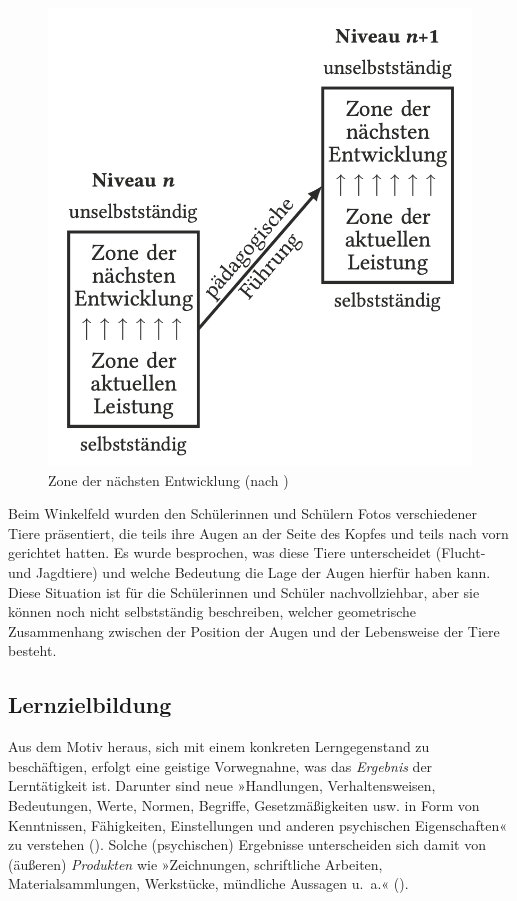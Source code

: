 \documentclass[
]{scrbook}
\renewenvironment{quote}{
  \list{}{
	\leftmargin0.2cm   %
    \rightmargin\leftmargin
      	\def\FrameCommand
    {%
        {\color{quoteColor}\vrule width 2pt}%
        \hspace{0pt}%
    }%
    \MakeFramed{\advance \hsize -\width \FrameRestore}    \color{quoteColor}
    }
  \item\relax
}
{\endlist\color{black}\endMakeFramed}
\theoremstyle{definition}
\theoremstyle{definition}
\theoremstyle{definition}
\theoremstyle{definition}
\theoremstyle{remark}
\begin{document}
\begin{figure}

{\centering \includegraphics[width=0.5\linewidth]{pictures/5-ZdnE} 

}

\caption{Zone der nächsten Entwicklung (nach )}\label{fig:ZdnE}
\end{figure}

\begin{quote}
Beim Winkelfeld wurden den Schülerinnen und Schülern Fotos verschiedener Tiere präsentiert, die teils ihre Augen an der Seite des Kopfes und teils nach vorn gerichtet hatten. Es wurde besprochen, was diese Tiere unterscheidet (Flucht- und Jagdtiere) und welche Bedeutung die Lage der Augen hierfür haben kann. Diese Situation ist für die Schülerinnen und Schüler nachvollziehbar, aber sie können noch nicht selbstständig beschreiben, welcher geometrische Zusammenhang zwischen der Position der Augen und der Lebensweise der Tiere besteht.
\end{quote}

\subsection{Lernzielbildung}\label{lernzielbildung}

Aus dem Motiv heraus, sich mit einem konkreten Lerngegenstand zu beschäftigen, erfolgt eine geistige Vorwegnahne, was das \emph{Ergebnis} der Lerntätigkeit ist. Darunter sind neue »Handlungen, Verhaltensweisen, Bedeutungen, Werte, Normen, Begriffe, Gesetzmäßigkeiten usw. in Form von Kenntnissen, Fähigkeiten, Einstellungen und anderen psychischen Eigenschaften« zu verstehen (). Solche (psychischen) Ergebnisse unterscheiden sich damit von (äußeren) \emph{Produkten} wie »Zeichnungen, schriftliche Arbeiten, Materialsammlungen, Werkstücke, mündliche Aussagen u.~a.« ().
\end{document}
